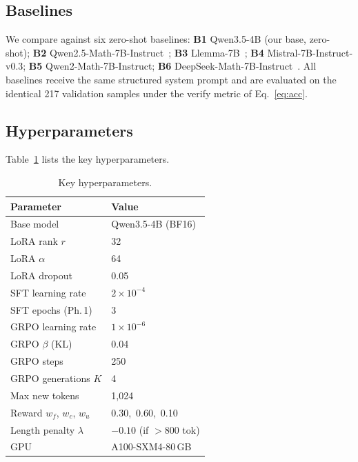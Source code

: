 \documentclass{ieeeaccess}
\newcommand{\basemodelname}{Qwen3.5-4B}
\begin{document}
\subsection{Baselines}

We compare against six zero-shot baselines:
\textbf{B1} \basemodelname{} (our base, zero-shot);
\textbf{B2} Qwen2.5-Math-7B-Instruct~\cite{Yang2024};
\textbf{B3} Llemma-7B~\cite{Azerbayev2024};
\textbf{B4} Mistral-7B-Instruct-v0.3;
\textbf{B5} Qwen2-Math-7B-Instruct;
\textbf{B6} DeepSeek-Math-7B-Instruct~\cite{Shao2024}.
All baselines receive the same structured system prompt and are evaluated
on the identical 217 validation samples under the verify metric of
Eq.~\eqref{eq:acc}.

\subsection{Hyperparameters}

Table~\ref{tab:hyperparams} lists the key hyperparameters.

\begin{table}[t]
\centering
\caption{Key hyperparameters.}
\label{tab:hyperparams}
\setlength{\tabcolsep}{5pt}
\begin{tabular}{@{}ll@{}}
\toprule
\textbf{Parameter} & \textbf{Value} \\
\midrule
Base model           & \basemodelname{} (BF16) \\
LoRA rank $r$        & 32 \\
LoRA $\alpha$        & 64 \\
LoRA dropout         & 0.05 \\
SFT learning rate    & $2\times10^{-4}$ \\
SFT epochs (Ph.\,1)  & 3 \\
GRPO learning rate   & $1\times10^{-6}$ \\
GRPO $\beta$ (KL)    & 0.04 \\
GRPO steps           & 250 \\
GRPO generations $K$ & 4 \\
Max new tokens       & 1,024 \\
Reward $w_f$, $w_c$, $w_u$ & 0.30,\ 0.60,\ 0.10 \\
Length penalty $\lambda$ & $-0.10$ (if $>$800 tok) \\
GPU                  & A100-SXM4-80\,GB \\
\bottomrule
\end{tabular}
\end{table}
\end{document}
